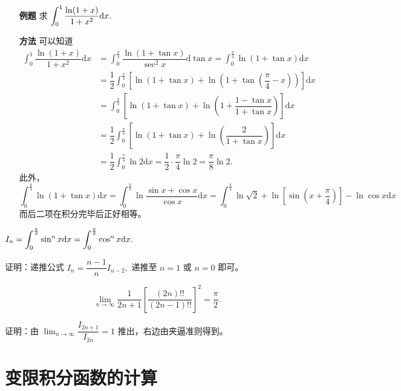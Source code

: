\begin{enumerate}
    \item[\textbf{例题}] 求 $ \displaystyle \int_0^1 \dfrac{\ln (1+x)}{1+x^2}\mathrm{d}x. $ 
    \item[\textbf{方法}] 可以知道
    \begin{equation*}
        \begin{aligned}
            \int_0^1 \dfrac{\ln (1+x)}{1+x^2}\mathrm{d}x &= 
            \int_0^\frac{\pi}{4} \dfrac{\ln (1+\tan x)}{\sec^2 x}\mathrm{d}\tan x 
            = \int_0^\frac{\pi}{4} \ln (1+\tan x)\mathrm{d}x \\ 
            &= \dfrac{1}{2}\int_0^\frac{\pi}{4} \left[\ln (1+\tan x) + \ln(1+\tan(\dfrac{\pi}{4}-x))\right]\mathrm{d}x 
            \\ &= \int_0^\frac{\pi}{4} \left[\ln (1+\tan x) + 
            \ln\left(1+\dfrac{1-\tan x}{1+\tan x}\right)\right]\mathrm{d}x \\ 
            &= \dfrac{1}{2}\int_0^\frac{\pi}{4} \left[\ln (1+\tan x) + 
            \ln\left(\dfrac{2}{1+\tan x}\right)\right]\mathrm{d}x \\ 
            &= \dfrac{1}{2}\int_0^\frac{\pi}{4}\ln 2\mathrm{d}x = \dfrac{1}{2}\cdot \dfrac{\pi}{4}\ln 2
            = \dfrac{\pi}{8}\ln 2.
        \end{aligned}
    \end{equation*}
    此外，$$
    \int_0^\frac{\pi}{4} \ln (1+\tan x)\mathrm{d}x = 
    \int_0^\frac{\pi}{4} \ln \dfrac{\sin x+\cos x}{\cos x}\mathrm{d}x
    = \int_0^\frac{\pi}{4} \ln \sqrt{2}+\ln \left[\sin (x+\dfrac{\pi}{4})\right]
    -\ln \cos x\mathrm{d}x 
    $$
    而后二项在积分完毕后正好相等。
\end{enumerate}


$ \displaystyle I_n = \int_0^\frac{\pi}{2}\sin^n x \mathrm{d}x = \int_0^\frac{\pi}{2}\cos^n x \mathrm{d}x. $ 

证明：递推公式 $ I_n = \dfrac{n-1}{n}I_{n-2}, $ 递推至 $ n = 1 $ 或 $ n = 0 $ 即可。

$$
    {\displaystyle\lim_{n\rightarrow \infty}}\dfrac{1}{2n+1}\left[\dfrac{(2n)!!}{(2n-1)!!} \right]^2
    = \dfrac{\pi}{2}.
$$

证明：由 $ {\displaystyle\lim_{n\rightarrow \infty}}\dfrac{I_{2n+1}}{I_{2n}} = 1 $ 
推出，右边由夹逼准则得到。

\section{变限积分函数的计算}

